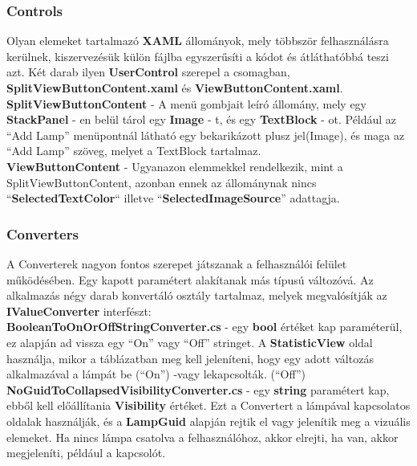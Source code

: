 \documentclass[a4paper,12pt]{report}
\begin{document}
\subsubsection{Controls}
    Olyan elemeket tartalmazó \textbf{XAML} állományok, mely többször felhasználásra kerülnek, kiszervezésük külön fájlba egyszerűsíti a kódot
    és átláthatóbbá teszi azt. Két darab ilyen \textbf{UserControl} szerepel a csomagban, \textbf{SplitViewButtonContent.xaml} és
    \textbf{ViewButtonContent.xaml}.\\

    \textbf{SplitViewButtonContent} - A menü gombjait leíró állomány, mely egy \textbf{StackPanel} - en belül tárol egy \textbf{Image} - t,
    és egy \textbf{TextBlock} - ot. Például az ``Add Lamp'' menüpontnál látható egy bekarikázott plusz jel(Image), és maga az ``Add Lamp''
    szöveg, melyet a TextBlock tartalmaz.\\

    \textbf{ViewButtonContent} - Ugyanazon elemmekkel rendelkezik, mint a SplitViewButtonContent, azonban ennek az állománynak nincs
    ``\textbf{SelectedTextColor}`` illetve ``\textbf{SelectedImageSource}'' adattagja.

\subsubsection{Converters}
    A Converterek nagyon fontos szerepet játszanak a felhasználói felület működésében. Egy kapott paramétert alakítanak más típusú
    változóvá. Az alkalmazás négy darab konvertáló osztály tartalmaz, melyek megvalósítják az \textbf{IValueConverter} interfészt:\\

    \textbf{BooleanToOnOrOffStringConverter.cs} - egy \textbf{bool} értéket kap paraméterül, ez alapján ad vissza egy ``On'' vagy
    ``Off'' stringet. A \textbf{StatisticView} oldal használja, mikor a táblázatban meg kell jeleníteni, hogy egy adott változás
    alkalmazával a lámpát be (``On'')  -vagy lekapcsolták. (``Off'')\\

    \textbf{NoGuidToCollapsedVisibilityConverter.cs} - egy \textbf{string} paramétert kap, ebből kell előállítania \textbf{Visibility} értéket.
    Ezt a Convertert a lámpával kapcsolatos oldalak használják, és a \textbf{LampGuid} alapján rejtik el vagy jelenítik meg
    a vizuális elemeket. Ha nincs lámpa csatolva a felhasználóhoz, akkor elrejti, ha van, akkor megjeleníti, például a kapcsolót.\\
\end{document}
